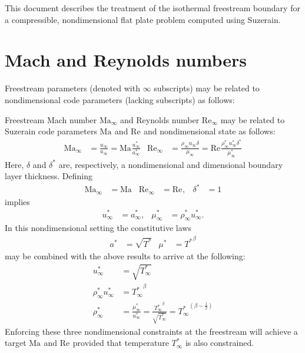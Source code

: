 \documentclass[letterpaper,11pt,nointlimits,reqno]{amsart}
\newcommand{\Mach}[1][]{\ensuremath{\mbox{Ma}_{#1}}}
\newcommand{\Reynolds}[1][]{\ensuremath{\mbox{Re}_{#1}}}
\begin{document}
This document describes the treatment of the isothermal freestream boundary for
a compressible, nondimensional flat plate problem computed using Suzerain.

\section{Mach and Reynolds numbers}


Freestream parameters (denoted with $\infty$ subscripts) may be related
to nondimensional code parameters (lacking subscripts) as follows:

Freestream Mach number $\Mach[\infty]$ and Reynolds number $\Reynolds[\infty]$
may be related to Suzerain code parameters $\Mach$ and $\Reynolds$ and
nondimensional state as follows:
\begin{align}
  \Mach[\infty]{}
  &=         \frac{u_\infty     }{a_\infty     }
   = \Mach{} \frac{u_\infty^\ast}{a_\infty^\ast}
&
  \Reynolds[\infty]{}
  &=             \frac{\rho_\infty      u_\infty      \delta     }{\mu_\infty     }
   = \Reynolds{} \frac{\rho_\infty^\ast u_\infty^\ast \delta^\ast}{\mu_\infty^\ast}
\end{align}
Here, $\delta$ and $\delta^\ast$ are, respectively, a nondimensional and
dimensional boundary layer thickness.
Defining
\begin{align}
  \Mach[\infty]{} &= \Mach
& \Reynolds[\infty]{} &= \Reynolds,
& \delta^\ast &= 1
\end{align}
implies
\begin{align}
  u_\infty^\ast   &= a_\infty^\ast,
& \mu_\infty^\ast &= \rho_\infty^\ast u_\infty^\ast
.
\end{align}
In this nondimensional setting the constitutive laws
\begin{align}
  a^\ast &= \sqrt{T^\ast}
& \mu^\ast &= {T^\ast}^\beta
\end{align}
may be combined with the above results to arrive at the following:
\begin{align}
  u_\infty^\ast &= \sqrt{T_\infty^\ast}
\\
  \rho_\infty^\ast u_\infty^\ast &= {T_\infty^\ast}^\beta
\\
  \rho_\infty^\ast &= \frac{\mu_\infty^\ast}{u_\infty^\ast}
                    = \frac{{T_\infty^\ast}^\beta}{\sqrt{T_\infty^\ast}}
                    = {T_\infty^\ast}^{\left(\beta-\frac{1}{2}\right)}
\end{align}
Enforcing these three nondimensional constraints at the freestream will achieve
a target $\Mach$ and $\Reynolds$ provided that temperature $T_\infty^\ast$ is
also constrained.
\end{document}
